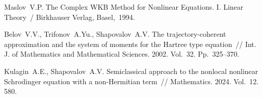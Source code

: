 %



\begin{thebibliography}{9} %

 Maslov~V.P. The Complex WKB Method for Nonlinear Equations. I. Linear Theory~/ Birkhauser Verlag, Basel,~1994.

 Belov~V.V., Trifonov~A.Yu., Shapovalov~A.V. The trajectory-coherent approximation and the system of moments for the Hartree type equation~// Int. J. of Mathematics and Mathematical Sciences. 2002. Vol.~32. Pp.~325--370.

 Kulagin~A.E., Shapovalov~A.V. Semiclassical approach to the nonlocal nonlinear Schrodinger equation with a non-Hermitian term~// Mathematics. 2024. Vol.~12. 580.


\end{thebibliography}



\author{А.~Е.~Кулагин
  \and
  А.~В.~Шаповалов
}





%

